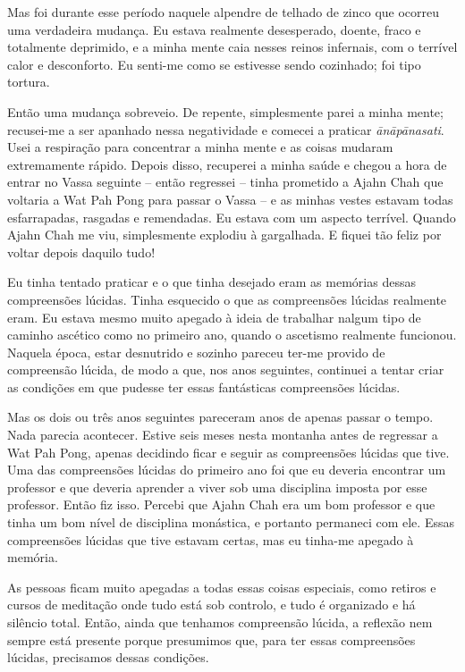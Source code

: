 Mas foi durante esse período naquele alpendre de telhado de zinco que ocorreu
uma verdadeira mudança. Eu estava realmente desesperado, doente, fraco e
totalmente deprimido, e a minha mente caia nesses reinos infernais, com o
terrível calor e desconforto. Eu senti-me como se estivesse sendo cozinhado; foi
tipo tortura.

Então uma mudança sobreveio. De repente, simplesmente parei a minha mente;
recusei-me a ser apanhado nessa negatividade e comecei a praticar
\emph{ānāpānasati}. Usei a respiração para concentrar a minha mente e as coisas
mudaram extremamente rápido. Depois disso, recuperei a minha saúde e chegou a
hora de entrar no Vassa seguinte -- então regressei -- tinha prometido a Ajahn
Chah que voltaria a Wat Pah Pong para passar o Vassa -- e as minhas vestes
estavam todas esfarrapadas, rasgadas e remendadas. Eu estava com um aspecto
terrível. Quando Ajahn Chah me viu, simplesmente explodiu à gargalhada. E fiquei
tão feliz por voltar depois daquilo tudo!

Eu tinha tentado praticar e o que tinha desejado eram as memórias dessas
compreensões lúcidas. Tinha esquecido o que as compreensões lúcidas realmente
eram. Eu estava mesmo muito apegado à ideia de trabalhar nalgum tipo de caminho
ascético como no primeiro ano, quando o ascetismo realmente funcionou. Naquela
época, estar desnutrido e sozinho pareceu ter-me provido de compreensão lúcida,
de modo a que, nos anos seguintes, continuei a tentar criar as condições em que
pudesse ter essas fantásticas compreensões lúcidas.

Mas os dois ou três anos seguintes pareceram anos de apenas passar o tempo. Nada
parecia acontecer. Estive seis meses nesta montanha antes de regressar a Wat Pah
Pong, apenas decidindo ficar e seguir as compreensões lúcidas que tive. Uma das
compreensões lúcidas do primeiro ano foi que eu deveria encontrar um professor e
que deveria aprender a viver sob uma disciplina imposta por esse professor.
Então fiz isso. Percebi que Ajahn Chah era um bom professor e que tinha um bom
nível de disciplina monástica, e portanto permaneci com ele. Essas compreensões
lúcidas que tive estavam certas, mas eu tinha-me apegado à memória.

As pessoas ficam muito apegadas a todas essas coisas especiais, como retiros e
cursos de meditação onde tudo está sob controlo, e tudo é organizado e há
silêncio total. Então, ainda que tenhamos compreensão lúcida, a reflexão nem
sempre está presente porque presumimos que, para ter essas compreensões lúcidas,
precisamos dessas condições.

